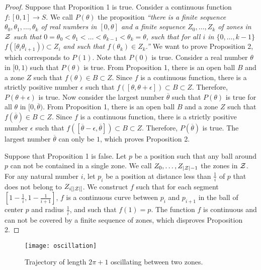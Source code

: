 \documentclass{article}
\begin{document}
\begin{proof}
Suppose that Proposition 1 is true. Consider a continuous function $f:[0,1]\rightarrow S$. We call $P(\theta)$ the proposition {\em ``there is a finite sequence $\theta_0,\theta_1,\dots,\theta_k$ of real numbers in $[0,\theta]$ and a finite sequence $Z_0,\dots,Z_k$ of zones in $\cal Z$ such that $0=\theta_0<\theta_1<\dots<\theta_{k-1}<\theta_k=\theta$, such that for all $i$ in $\{0,\dots,k-1\}$ $f([\theta_i\theta_{i+1}))\subset Z_i$ and such that $f(\theta_k)\in Z_k$.''} We want to prove Proposition 2, which corresponds to $P(1)$. Note that $P(0)$ is true.
Consider a real number $\theta$ in $[0,1)$ such that $P(\theta)$ is true. From Proposition 1, there is an open ball $B$ and a zone $Z$ such that $f(\theta)\in B\subset Z$. Since $f$ is a continuous function, there is a strictly positive number $\epsilon$ such that $f([\theta,\theta+\epsilon])\subset B\subset Z$. Therefore, $P(\theta+\epsilon)$ is true.
Now consider the largest number $\overline \theta$ such that $P(\theta)$ is true for all $\theta$ in $[0,\overline\theta)$. From Proposition 1, there is an open ball $B$ and a zone $Z$ such that $f(\overline\theta)\in B\subset Z$. Since $f$ is a continuous function, there is a strictly positive number $\epsilon$ such that $f([\overline\theta-\epsilon,\overline\theta])\subset B\subset Z$. Therefore, $P(\overline\theta)$ is true. The largest number $\overline\theta$ can only be $1$, which proves Proposition 2.

Suppose that Proposition 1 is false. Let $p$ be a position such that any ball around $p$ can not be contained in a single zone. We call $Z_0, \dots,Z_{|{\cal Z}|-1}$ the zones in $\cal Z$. For any natural number $i$, let $p_i$ be a position at distance less than $\frac{1}{i}$ of $p$ that does not belong to $Z_{i[|{\cal Z}|]}$. We construct $f$ such that for each segment $[1-\frac{1}{i}, 1-\frac{1}{i+1}]$, $f$ is a continuous curve between $p_i$ and $p_{i+1}$ in the ball of center $p$ and radius $\frac{1}{i}$, and such that $f(1)=p$. The function $f$ is continuous and can not be covered by a finite sequence of zones, which disproves Proposition 2.
\end{proof}

\begin{figure}[h]
\begin{center}
\texttt{[image: oscillation]}
\caption{Trajectory of length $2\pi+1$ oscillating between two zones.}
\label{fig_oscillation}
\end{center}
\end{figure}
\end{document}
